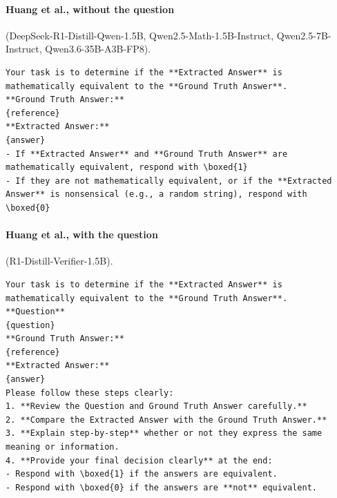 \documentclass[11pt]{article}
\begin{document}
\raggedbottom
\par\addvspace{2ex}\noindent\begin{minipage}{\columnwidth}
\paragraph{Huang et al., without the question} (DeepSeek-R1-Distill-Qwen-1.5B, Qwen2.5-Math-1.5B-Instruct,
Qwen2.5-7B-Instruct, Qwen3.6-35B-A3B-FP8).
\begin{Verbatim}[breaklines, breakanywhere, fontsize=\scriptsize, frame=single]
Your task is to determine if the **Extracted Answer** is mathematically equivalent to the **Ground Truth Answer**.
**Ground Truth Answer:**
{reference}
**Extracted Answer:**
{answer}
- If **Extracted Answer** and **Ground Truth Answer** are mathematically equivalent, respond with \boxed{1}
- If they are not mathematically equivalent, or if the **Extracted Answer** is nonsensical (e.g., a random string), respond with \boxed{0}
\end{Verbatim}
\end{minipage}

\par\addvspace{2ex}\noindent\begin{minipage}{\columnwidth}
\paragraph{Huang et al., with the question} (R1-Distill-Verifier-1.5B).
\begin{Verbatim}[breaklines, breakanywhere, fontsize=\scriptsize, frame=single]
Your task is to determine if the **Extracted Answer** is mathematically equivalent to the **Ground Truth Answer**.
**Question**
{question}
**Ground Truth Answer:**
{reference}
**Extracted Answer:**
{answer}
Please follow these steps clearly:
1. **Review the Question and Ground Truth Answer carefully.**
2. **Compare the Extracted Answer with the Ground Truth Answer.**
3. **Explain step-by-step** whether or not they express the same meaning or information.
4. **Provide your final decision clearly** at the end:
- Respond with \boxed{1} if the answers are equivalent.
- Respond with \boxed{0} if the answers are **not** equivalent.
\end{Verbatim}
\end{minipage}
\end{document}
